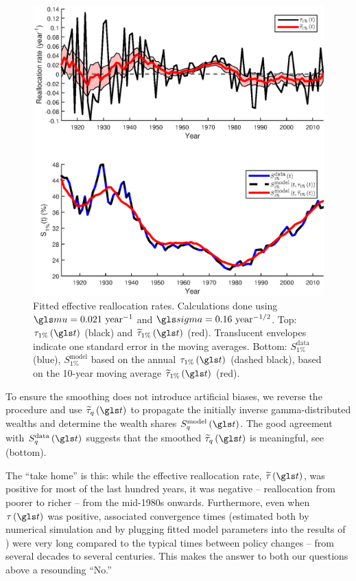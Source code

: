 \begin{figure}[!htb]
\centering
\includegraphics[width=1.0\textwidth] {./chapter_3/figs/tau_top1.eps}
\caption{Fitted effective reallocation rates. Calculations done using $\gmu=0.021 \text{ year}^{-1}$ and $\gsigma=0.16 \text{ year}^{-1/2}$. Top: $\tau_{1\%}\left(\t\right)$ (black) and $\widetilde{\tau}_{1\%}\left(\t\right)$ (red). Translucent envelopes indicate one standard error in the moving averages. Bottom: $S^{\text{data}}_{1\%}$ (blue), $S^{\text{model}}_{1\%}$ based on the annual $\tau_{1\%}\left(\t\right)$ (dashed black), based on the 10-year moving average $\widetilde{\tau}_{1\%}\left(\t\right)$ (red).}
\end{figure}

To ensure the smoothing does not introduce artificial biases, we reverse the procedure and use $\widetilde{\tau}_q\left(\t\right)$ to propagate the initially inverse gamma-distributed wealths and determine the wealth shares $S^{\text{model}}_q\left(\t\right)$. The good agreement with $S^{\text{data}}_q\left(\t\right)$ suggests that the smoothed $\widetilde{\tau}_q\left(\t\right)$ is meaningful, see  (bottom).

The ``take home'' is this: while the effective reallocation rate, $\widetilde{\tau}\left(\t\right)$, was positive for most of the last hundred years, it was negative -- \ie reallocation from poorer to richer -- from the mid-1980s onwards. Furthermore, even when $\tau\left(\t\right)$ was positive, associated convergence times (estimated both by numerical simulation and by plugging fitted model parameters into the results of ) were very long compared to the typical times between policy changes -- from several decades to several centuries. This makes the answer to both our questions above a resounding ``No.''


